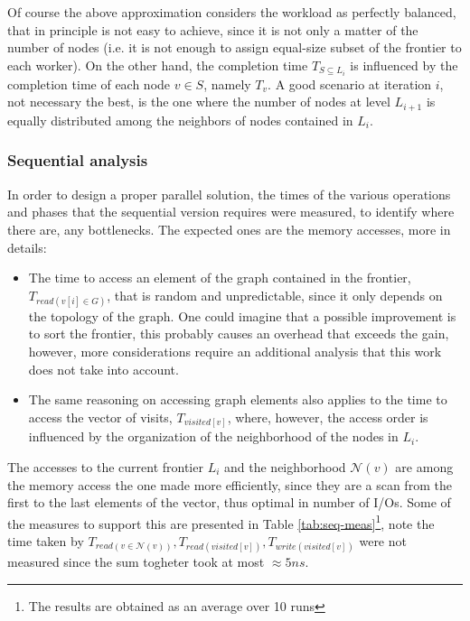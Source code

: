 Of course the above approximation considers the workload as perfectly balanced,
that in principle is not easy to achieve, since it is not only
a matter of the number of nodes (i.e. it is not enough to assign equal-size
subset of the frontier to each worker). On the other hand, the completion time $T_{S \subseteq L_i}$
is influenced by the completion time of each node $v \in S$, namely $T_v$. A good scenario at iteration $i$, not necessary the best,
is the one where the number of nodes at level $L_{i+1}$ is equally
distributed among the neighbors of nodes contained in $L_i$.
\subsubsection{Sequential analysis}
In order to design a proper parallel solution, 
the times of the various operations and phases that the sequential
 version requires were measured, to identify where there are, any bottlenecks.
The expected ones are the memory accesses, more in details:
\begin{itemize}
    \item The time to access an element of the graph contained in the frontier,
    $T_{read(v[i]\in G)}$, that is 
    random and unpredictable, since it only depends on the topology of the graph. One could
    imagine that a possible improvement is to sort the frontier, this probably causes
    an overhead that exceeds the gain, however, more 
    considerations require an additional 
    analysis that this work does not take into account.
    \item The same reasoning on accessing graph elements
     also applies to the time to access the vector of visits, $T_{visited[v]}$, where, however, 
    the access order is influenced by the organization of the neighborhood 
    of the nodes in $L_i$.
\end{itemize}
The accesses to the current frontier $L_i$ and the neighborhood $\mathcal{N}(v)$ are among the memory access 
the one made more efficiently, since they are a scan from the 
first to the last elements
of the vector, thus optimal in number of I/Os. Some of
 the measures to support this are presented in Table \ref{tab:seq-meas}\footnote{The results are obtained as an average over 10 runs}, note the time taken by $T_{read(v \in \mathcal{N}(v))}, T_{read(visited[v])}, T_{write(visited[v])}$ were not measured since the sum togheter took at most $\approx 5ns$.

